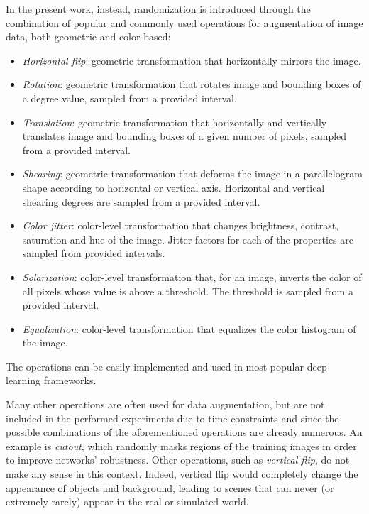 \documentclass[%
    corpo=12pt,
    twoside,
    stile=classica,   
    tipotesi=magistrale,
    evenboxes,
    english,
	numerazioneromana,
]{toptesi}
\begin{document}
In the present work, instead, randomization is introduced through the combination of popular and commonly used operations for augmentation of image data, both geometric and color-based:
\begin{itemize}
	\item \textit{Horizontal flip}: geometric transformation that horizontally mirrors the image.
	\item \textit{Rotation}: geometric transformation that rotates image and bounding boxes of a degree value, sampled from a provided interval.
	\item \textit{Translation}: geometric transformation that horizontally and vertically translates image and bounding boxes of a given number of pixels, sampled from a provided interval.
	\item \textit{Shearing}: geometric transformation that deforms the image in a parallelogram shape according to horizontal or vertical axis. Horizontal and vertical shearing degrees are sampled from a provided interval.
	\item \textit{Color jitter}: color-level transformation that changes brightness, contrast, saturation and hue of the image. Jitter factors for each of the properties are sampled from provided intervals.
	\item \textit{Solarization}: color-level transformation that, for an image, inverts the color of all pixels whose value is above a threshold. The threshold is sampled from a provided interval.
	\item \textit{Equalization}: color-level transformation that equalizes the color histogram of the image.
\end{itemize}
The operations can be easily implemented and used in most popular deep learning frameworks.

\medskip
Many other operations are often used for data augmentation, but are not included in the performed experiments due to time constraints and since the possible combinations of the aforementioned operations are already numerous. An example is \textit{cutout}, which randomly masks regions of the training images in order to improve networks' robustness. Other operations, such as \textit{vertical flip}, do not make any sense in this context. Indeed, vertical flip would completely change the appearance of objects and background, leading to scenes that can never (or extremely rarely) appear in the real or simulated world.
\end{document}
